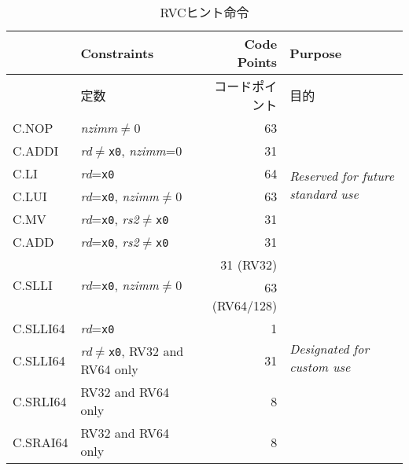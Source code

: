 \begin{table}[hbt]
\centering
\begin{tabular}{|l|l|r|l|}
  \hline
\begin{comment}
  Instruction             & Constraints                                 & Code Points & Purpose \\ \hline \hline
\end{comment}
  命令                    & 定数                                        & コードポイント & 目的 \\ \hline \hline
  C.NOP                   & {\em nzimm}$\neq$0                          & 63          & \multirow{6}{*}{\em Reserved for future standard use} \\ \cline{1-3}
  C.ADDI                  & {\em rd}$\neq${\tt x0}, {\em nzimm}=0       & 31          & \\ \cline{1-3}
  C.LI                    & {\em rd}={\tt x0}                           & 64          & \\ \cline{1-3}
  C.LUI                   & {\em rd}={\tt x0}, {\em nzimm}$\neq$0       & 63          & \\ \cline{1-3}
  C.MV                    & {\em rd}={\tt x0}, {\em rs2}$\neq${\tt x0}  & 31          & \\ \cline{1-3}
  C.ADD                   & {\em rd}={\tt x0}, {\em rs2}$\neq${\tt x0}  & 31          & \\ \hline \hline
  \multirow{2}{*}{C.SLLI} & \multirow{2}{*}{{\em rd}={\tt x0}, {\em nzimm}$\neq$0} & 31 (RV32)   & \multirow{6}{*}{\em Designated for custom use} \\
                          &                                             & 63 (RV64/128) & \\ \cline{1-3}
  C.SLLI64                & {\em rd}={\tt x0}                           & 1           & \\ \cline{1-3}
  C.SLLI64                & {\em rd}$\neq${\tt x0}, RV32 and RV64 only  & 31          & \\ \cline{1-3}
  C.SRLI64                & RV32 and RV64 only                          & 8           & \\ \cline{1-3}
  C.SRAI64                & RV32 and RV64 only                          & 8           & \\ \hline
\end{tabular}
\begin{comment}
\caption{RVC HINT instructions.}
\end{comment}
\caption{RVCヒント命令}
\label{tab:rvc-hints}
\end{table}

